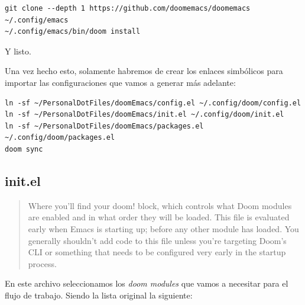 \documentclass[11pt]{article}
\begin{document}
\begin{verbatim}
git clone --depth 1 https://github.com/doomemacs/doomemacs ~/.config/emacs
~/.config/emacs/bin/doom install
\end{verbatim}

Y listo.

Una vez hecho esto, solamente habremos de crear los enlaces simbólicos para importar las configuraciones que vamos a generar más adelante:

\begin{verbatim}
ln -sf ~/PersonalDotFiles/doomEmacs/config.el ~/.config/doom/config.el
ln -sf ~/PersonalDotFiles/doomEmacs/init.el ~/.config/doom/init.el
ln -sf ~/PersonalDotFiles/doomEmacs/packages.el ~/.config/doom/packages.el
doom sync
\end{verbatim}
\subsection{init.el}
\label{sec:org76dd914}

\begin{quote}
Where you’ll find your doom! block, which controls what Doom modules are enabled and in what order they will be loaded.
This file is evaluated early when Emacs is starting up; before any other module has loaded. You generally shouldn’t add code to this file unless you’re targeting Doom’s CLI or something that needs to be configured very early in the startup process.
\end{quote}

En este archivo seleccionamos los \emph{doom modules} que vamos a necesitar para el flujo de trabajo. Siendo la lista original la siguiente:
\end{document}

